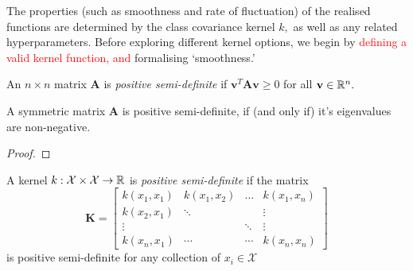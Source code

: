 
The properties (such as smoothness and rate of fluctuation) of the
realised functions are determined by the class
covariance kernel $k,$ as well as any related hyperparameters. Before exploring
different kernel options, we begin by
\textcolor{red}{defining a valid kernel function, and} formalising `smoothness.'

\color{red}

\begin{definition}\label{def:pos_def_mat}
    An $n\times n$ matrix $\mathbf{A}$ is \emph{positive semi-definite} if
    $\mathbf{v}^T\mathbf{A}\mathbf{v} \geq 0$ for all $\mathbf{v}\in\mathbb{R}^n.$
\end{definition}

\begin{theorem}
    A symmetric matrix $\mathbf{A}$ is positive semi-definite, if (and only if)
    it's eigenvalues are non-negative.
\end{theorem}
\begin{proof}
\end{proof}

\begin{definition}\label{def:pos_def_ker}
    A kernel $k:\mathcal{X}\times\mathcal{X}\to\mathbb{R}$ is
    \emph{positive semi-definite} if the matrix
    $$\mathbf{K} = \begin{bmatrix}
            k(x_1, x_1) & k(x_1, x_2) & \dots  & k(x_1, x_n) \\
            k(x_2, x_1) & \ddots      &        & \vdots      \\
            \vdots      &             & \ddots & \vdots      \\
            k(x_n, x_1) & \cdots      & \cdots & k(x_n, x_n)
        \end{bmatrix}$$
    is positive semi-definite for any collection of $x_i\in\mathcal{X}$
\end{definition}


